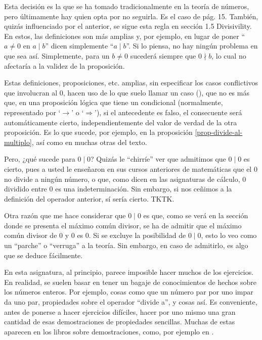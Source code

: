 Esta decisión es la que se ha tomado tradicionalmente en la teoría de
números, pero últimamente hay quien opta por no seguirla. Es el caso de
\cite{weissman} pág. 15. También, quizás influenciado por el
anterior, se sigue esta regla en \cite{comb-num-th-mileti} sección 1.5
Divisivility. En estos, las definiciones son más amplias y, por ejemplo, en
lugar de poner ``$a \neq 0$ en $a \mid b$'' dicen simplemente ``$a \mid
b$''. Si lo piensa, no hay ningún problema en que sea así. Simplemente, para
un $b \neq 0$ sucederá siempre que $0 \nmid b$, lo cual no afectaría a la
validez de la proposición.

Estas definiciones, proposiciones, etc. amplias, sin especificar los casos
conflictivos que involucran al 0, hacen uso de lo que suelo llamar un caso
 (), que no es más que, en una
proposición lógica que tiene un condicional (normalmente, representado por
`$\longrightarrow$' o `$\Longrightarrow$'), si el antecedente es falso, el
consecuente será automáticamente cierto, independientemente del valor de
verdad de la otra proposición. Es lo que sucede, por ejemplo, en la
proposición \ref{prop-divide-al-multiplo}, así como en muchas otras del
texto.

Pero, ¿qué sucede para $0 \mid 0$? Quizás le ``chirríe'' ver que admitimos
que $0 \mid 0$ es cierto, pues a usted le enseñaron en sus cursos anteriores
de matemáticas que el 0 no divide a ningún número, o que, como dicen en las
asignaturas de cálculo, 0 dividido entre 0 es una indeterminación. Sin
embargo, si nos ceñimos a la definición del operador anterior, sí sería
cierto. TKTK.

Otra razón que me hace considerar que $0 \mid 0$ es que, como se verá en la
sección donde se presenta el máximo común divisor, se ha de admitir que el
máximo común divisor de 0 y 0 es 0. Si se excluye la posibilidad de $0 \mid
0$, esto lo veo como un ``parche'' o ``verruga'' a la teoría. Sin embargo,
en caso de admitirlo, es algo que se deduce fácilmente.

En esta asignatura, al principio, parece imposible hacer muchos de los
ejercicios. En realidad, se suelen basar en tener un bagaje de conocimientos
de hechos sobre los números enteros. Por ejemplo, cosas como que un número
par por uno impar da uno par, propiedades sobre el operador ``divide a'', y
cosas así. Es conveniente, antes de ponerse a hacer ejercicios difíciles,
hacer por uno mismo una gran cantidad de esas demostraciones de propiedades
sencillas. Muchas de estas aparecen en los libros sobre demostraciones,
como, por ejemplo en \cite{proofs-cummings}.



